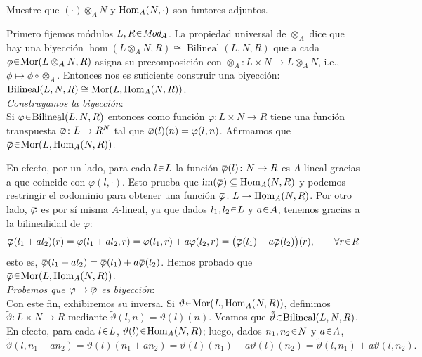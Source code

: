 \setcounter{neje}{3}
\begin{nejer}
Muestre que $(\cdot)\otimes_A N$ y $\operatorname{Hom}_A(N, \cdot)$ son funtores adjuntos.
\end{nejer}
\begin{sol}
Primero fijemos módulos $L,R\en\cat{Mod}_A$. La propiedad universal de $\otimes_A$ dice que hay una biyección $\hom(L\otimes_AN,R) \cong \operatorname{Bilineal}(L,N,R)$ que a cada $\phi \en \hom(L\otimes_AN,R)$ asigna su precomposición con $\otimes_A \colon L\times N \to L\otimes_AN$, i.e., $\phi \mapsto \phi \circ \otimes_A$. Entonces nos es suficiente construir una biyección: $\operatorname{Bilineal}(L,N,R) \cong \operatorname{Mor}(L,\operatorname{Hom}_A(N,R))$.\medskip\\
\emph{Construyamos la biyección}:\\
Si $\varphi \en \operatorname{Bilineal}(L,N,R)$ entonces como función $\varphi \colon L \times N \to R$ tiene una función transpuesta $\ubar{\varphi}\colon L \to R^N$ tal que $\ubar{\varphi}(l)(n) = \varphi(l,n)$. Afirmamos que $\ubar{\varphi} \en \hom(L,\Hom_A(N,R))$.\par
En efecto, por un lado, para cada $l\en L$ la función $\ubar{\varphi}(l) \colon N \to R$ es $A$-lineal gracias a que coincide con $\varphi(l,\cdot)$. Esto prueba que $\im(\ubar{\varphi}) \subseteq \Hom_A(N,R)$ y podemos restringir el codominio para obtener una función $\ubar{\varphi} \colon L \to \Hom_A(N,R)$. Por otro lado, $\ubar{\varphi}$ es por sí misma $A$-lineal, ya que dados $l_1,l_2 \en L$ y $a\en A$, tenemos gracias a la bilinealidad de $\varphi$:
\[
\ubar\varphi(l_1+al_2)(r) 
= \varphi(l_1+al_2,r)
= \varphi(l_1,r) + a\varphi(l_2,r)
= \bigl(\ubar\varphi(l_1) + a\ubar\varphi(l_2)\bigr)(r),
\qquad\forall r\en R
\]
esto es, $\ubar\varphi(l_1+al_2) = \ubar\varphi(l_1) + a\ubar\varphi(l_2)$. Hemos probado que $\ubar{\varphi} \en \hom(L,\Hom_A(N,R))$.\medskip\\
\emph{Probemos que $\varphi \mapsto\ubar{\varphi}$ es biyección}:\\
Con este fin, exhibiremos su inversa. Si $\vartheta \en \hom(L,\Hom_A(N,R))$, definimos $\tilde{\vartheta}\colon L\times N \to R$ mediante $\tilde{\vartheta}(l,n) = \vartheta(l)(n)$. Veamos que $\tilde{\vartheta}\en\operatorname{Bilineal}(L,N,R)$.
En efecto, para cada $l\en L$, $\vartheta(l)\en\Hom_A(N,R)$; luego, dados $n_1,n_2\en N$ y $a\en A$,
\[
\tilde{\vartheta}(l, n_1+an_2) = \vartheta(l)(n_1+an_2) = \vartheta(l)(n_1) + a\vartheta(l)(n_2) = \tilde{\vartheta}(l,n_1) + a\tilde{\vartheta}(l,n_2).
\]
\end{sol}
